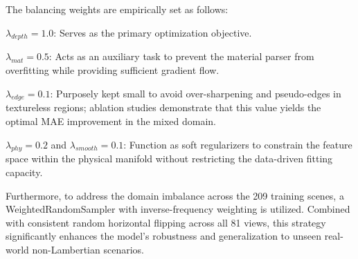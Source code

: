 The balancing weights are empirically set as follows:
\item $\lambda_{depth} = 1.0$: Serves as the primary optimization objective.
\item $\lambda_{mat} = 0.5$: Acts as an auxiliary task to prevent the material parser from overfitting while providing sufficient gradient flow.
\item $\lambda_{edge} = 0.1$: Purposely kept small to avoid over-sharpening and pseudo-edges in textureless regions; ablation studies demonstrate that this value yields the optimal MAE improvement in the mixed domain.
\item $\lambda_{phy} = 0.2$ and $\lambda_{smooth} = 0.1$: Function as soft regularizers to constrain the feature space within the physical manifold without restricting the data-driven fitting capacity.

Furthermore, to address the domain imbalance across the 209 training scenes, a WeightedRandomSampler with inverse-frequency weighting is utilized. Combined with consistent random horizontal flipping across all 81 views, this strategy significantly enhances the model's robustness and generalization to unseen real-world non-Lambertian scenarios.